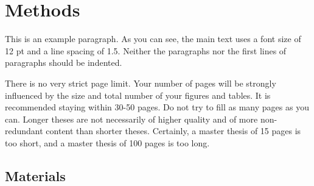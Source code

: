 
\chapter{Methods}

This is an example paragraph. As you can see, the main text uses a font size of 12 pt and a line spacing of 1.5. Neither the paragraphs nor the first lines of paragraphs should be indented.

There is no very strict page limit. Your number of pages will be strongly influenced by the size and total number of your figures and tables. It is recommended staying within 30-50 pages. Do not try to fill as many pages as you can. Longer theses are not necessarily of higher quality and of more non-redundant content than shorter theses. Certainly, a master thesis of 15 pages is too short, and a master thesis of 100 pages is too long.

\section{Materials}


\newpage



